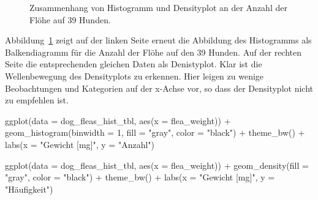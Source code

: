 \documentclass[
  letterpaper,
]{scrbook}
\newenvironment{Shaded}{\begin{snugshade}}{\end{snugshade}}
\newcommand{\AttributeTok}[1]{\textcolor[rgb]{0.40,0.45,0.13}{#1}}
\newcommand{\DecValTok}[1]{\textcolor[rgb]{0.68,0.00,0.00}{#1}}
\newcommand{\FunctionTok}[1]{\textcolor[rgb]{0.28,0.35,0.67}{#1}}
\newcommand{\NormalTok}[1]{\textcolor[rgb]{0.00,0.23,0.31}{#1}}
\newcommand{\SpecialCharTok}[1]{\textcolor[rgb]{0.37,0.37,0.37}{#1}}
\newcommand{\StringTok}[1]{\textcolor[rgb]{0.13,0.47,0.30}{#1}}
\begin{document}
\begin{figure}
\begin{minipage}[t]{0.50\linewidth}
{{}

}

\end{minipage}%

\caption{\label{fig-dens-flea-1}Zusammenhang von Histogramm und
Densityplot an der Anzahl der Flöhe auf 39 Hunden.}

\end{figure}

Abbildung~\ref{fig-dens-flea-1} zeigt auf der linken Seite erneut die
Abbildung des Histogramms als Balkendiagramm für die Anzahl der Flöhe
auf den 39 Hunden. Auf der rechten Seite die entsprechenden gleichen
Daten als Denistyplot. Klar ist die Wellenbewegung des Densityplots zu
erkennen. Hier leigen zu wenige Beobachtungen und Kategorien auf der
x-Achse vor, so dass der Densityplot nicht zu empfehlen ist.

\begin{Shaded}
\begin{Highlighting}[]
\FunctionTok{ggplot}\NormalTok{(}\AttributeTok{data =}\NormalTok{ dog\_fleas\_hist\_tbl, }\FunctionTok{aes}\NormalTok{(}\AttributeTok{x =}\NormalTok{ flea\_weight)) }\SpecialCharTok{+}
  \FunctionTok{geom\_histogram}\NormalTok{(}\AttributeTok{binwidth =} \DecValTok{1}\NormalTok{, }\AttributeTok{fill =} \StringTok{"gray"}\NormalTok{, }\AttributeTok{color =} \StringTok{"black"}\NormalTok{) }\SpecialCharTok{+}
  \FunctionTok{theme\_bw}\NormalTok{() }\SpecialCharTok{+}
  \FunctionTok{labs}\NormalTok{(}\AttributeTok{x =} \StringTok{"Gewicht [mg]"}\NormalTok{, }\AttributeTok{y =} \StringTok{"Anzahl"}\NormalTok{) }

\FunctionTok{ggplot}\NormalTok{(}\AttributeTok{data =}\NormalTok{ dog\_fleas\_hist\_tbl, }\FunctionTok{aes}\NormalTok{(}\AttributeTok{x =}\NormalTok{ flea\_weight)) }\SpecialCharTok{+}
  \FunctionTok{geom\_density}\NormalTok{(}\AttributeTok{fill =} \StringTok{"gray"}\NormalTok{, }\AttributeTok{color =} \StringTok{"black"}\NormalTok{) }\SpecialCharTok{+}
  \FunctionTok{theme\_bw}\NormalTok{() }\SpecialCharTok{+}
  \FunctionTok{labs}\NormalTok{(}\AttributeTok{x =} \StringTok{"Gewicht [mg]"}\NormalTok{, }\AttributeTok{y =} \StringTok{"Häufigkeit"}\NormalTok{) }
\end{Highlighting}
\end{Shaded}
\end{document}
